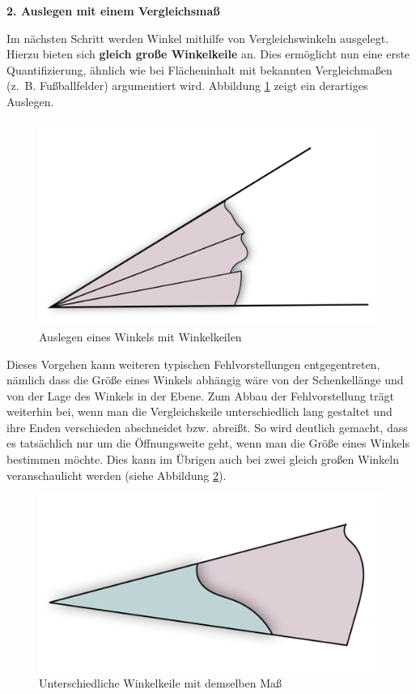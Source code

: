 \documentclass[
]{scrbook}
\theoremstyle{definition}
\theoremstyle{definition}
\theoremstyle{definition}
\theoremstyle{definition}
\theoremstyle{remark}
\begin{document}
\textbf{2. Auslegen mit einem Vergleichsmaß}

Im nächsten Schritt werden Winkel mithilfe von Vergleichswinkeln ausgelegt. Hierzu bieten sich \textbf{gleich große Winkelkeile} an. Dies ermöglicht nun eine erste Quantifizierung, ähnlich wie bei Flächeninhalt mit bekannten Vergleichmaßen (z.~B. Fußballfelder) argumentiert wird. Abbildung \ref{fig:Winkelauslegen} zeigt ein derartiges Auslegen.

\begin{figure}

{\centering \includegraphics[width=0.5\linewidth]{pictures/11-Winkelauslegen} 

}

\caption{Auslegen eines Winkels mit Winkelkeilen}\label{fig:Winkelauslegen}
\end{figure}

Dieses Vorgehen kann weiteren typischen Fehlvorstellungen entgegentreten, nämlich dass die Größe eines Winkels abhängig wäre von der Schenkellänge und von der Lage des Winkels in der Ebene. Zum Abbau der Fehlvorstellung trägt weiterhin bei, wenn man die Vergleichskeile unterschiedlich lang gestaltet und ihre Enden verschieden abschneidet bzw. abreißt. So wird deutlich gemacht, dass es tatsächlich nur um die Öffnungsweite geht, wenn man die Größe eines Winkels bestimmen möchte. Dies kann im Übrigen auch bei zwei gleich großen Winkeln veranschaulicht werden (siehe Abbildung \ref{fig:Winkelkeile}).

\begin{figure}

{\centering \includegraphics[width=0.5\linewidth]{pictures/11-Winkelkeile} 

}

\caption{Unterschiedliche Winkelkeile mit demselben Maß}\label{fig:Winkelkeile}
\end{figure}
\end{document}
